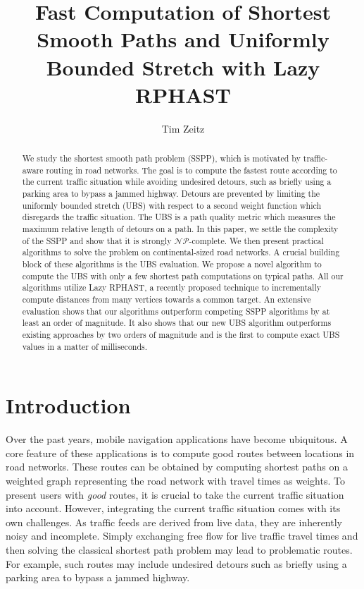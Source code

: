 \documentclass[a4paper,UKenglish,cleveref, autoref, thm-restate]{lipics-v2021}
\title{Fast Computation of Shortest Smooth Paths and Uniformly Bounded Stretch with Lazy RPHAST} %
\author{Tim Zeitz}{Karlsruhe Institute of Technology, Germany}{tim.zeitz@kit.edu}{https://orcid.org/0000-0003-4746-3582}{}%
\begin{document}
\maketitle

\begin{abstract}
We study the shortest smooth path problem (SSPP), which is motivated by traffic-aware routing in road networks.
The goal is to compute the fastest route according to the current traffic situation while avoiding undesired detours, such as briefly using a parking area to bypass a jammed highway.
Detours are prevented by limiting the uniformly bounded stretch (UBS) with respect to a second weight function which disregards the traffic situation.
The UBS is a path quality metric which measures the maximum relative length of detours on a path.
In this paper, we settle the complexity of the SSPP and show that it is strongly $\mathcal{NP}$-complete.
We then present practical algorithms to solve the problem on continental-sized road networks.
A crucial building block of these algorithms is the UBS evaluation.
We propose a novel algorithm to compute the UBS with only a few shortest path computations on typical paths.
All our algorithms utilize Lazy RPHAST, a recently proposed technique to incrementally compute distances from many vertices towards a common target.
An extensive evaluation shows that our algorithms outperform competing SSPP algorithms by at least an order of magnitude.
It also shows that our new UBS algorithm outperforms existing approaches by two orders of magnitude and is the first to compute exact UBS values in a matter of milliseconds.
\end{abstract}

\newpage

\section{Introduction}

Over the past years, mobile navigation applications have become ubiquitous.
A core feature of these applications is to compute good routes between locations in road networks.
These routes can be obtained by computing shortest paths on a weighted graph representing the road network with travel times as weights.
To present users with \emph{good} routes, it is crucial to take the current traffic situation into account.
However, integrating the current traffic situation comes with its own challenges.
As traffic feeds are derived from live data, they are inherently noisy and incomplete.
Simply exchanging free flow for live traffic travel times and then solving the classical shortest path problem may lead to problematic routes.
For example, such routes may include undesired detours such as briefly using a parking area to bypass a jammed highway.
\end{document}
